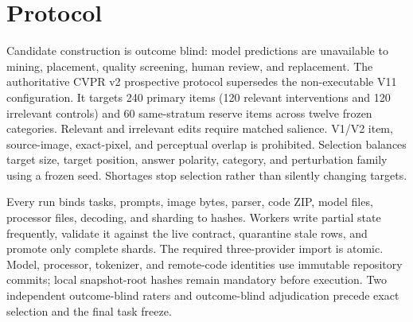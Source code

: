 \section{Protocol}
Candidate construction is outcome blind: model predictions are unavailable to mining, placement,
quality screening, human review, and replacement. The authoritative CVPR v2 prospective protocol
supersedes the non-executable V11 configuration. It targets 240 primary items (120 relevant
interventions and 120 irrelevant controls) and 60 same-stratum reserve items across twelve frozen
categories. Relevant and irrelevant edits require matched salience. V1/V2 item, source-image,
exact-pixel, and perceptual overlap is prohibited. Selection balances target size, target position,
answer polarity, category, and perturbation family using a frozen seed. Shortages stop selection rather
than silently changing targets.

Every run binds tasks, prompts, image bytes, parser, code ZIP, model files, processor files, decoding,
and sharding to hashes. Workers write partial state frequently, validate it against the live contract,
quarantine stale rows, and promote only complete shards. The required three-provider import is atomic.
Model, processor, tokenizer, and remote-code identities use immutable repository commits; local
snapshot-root hashes remain mandatory before execution. Two independent outcome-blind raters and
outcome-blind adjudication precede exact selection and the final task freeze.

